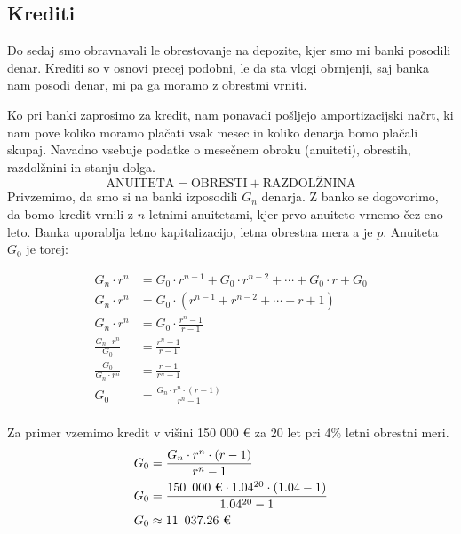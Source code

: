 \documentclass[12pt]{article}
\begin{document}
    \subsection{Krediti}
    Do sedaj smo obravnavali le obrestovanje na depozite, kjer smo mi banki posodili denar.
    Krediti so v osnovi precej podobni, le da sta vlogi obrnjenji, saj banka nam posodi
    denar, mi pa ga moramo z obrestmi vrniti.

    Ko pri banki zaprosimo za kredit, nam ponavadi pošljejo amportizacijski načrt, ki nam
    pove koliko moramo plačati vsak mesec in koliko denarja bomo plačali skupaj. Navadno
    vsebuje podatke o mesečnem obroku (anuiteti), obrestih, razdolžnini in 
    stanju dolga. 
    $$\text{ANUITETA} = \text{OBRESTI} + \text{RAZDOLŽNINA}$$
    Privzemimo, da smo si na banki izposodili $G_n$ denarja. Z banko se dogovorimo, da bomo
    kredit vrnili z $n$ letnimi anuitetami, kjer prvo anuiteto vrnemo čez eno leto. Banka
    uporablja letno kapitalizacijo, letna obrestna mera a je $p$. Anuiteta $G_0$ je torej:
    
    \begin{equation}
        \begin{split}
            G_n \cdot r^n & = G_0 \cdot r^{n - 1} + G_0 \cdot r^{n - 2} + \cdots + G_0 \cdot r + G_0 \\
            G_n \cdot r^n & = G_0 \cdot (r^{n - 1} + r^{n - 2} + \cdots + r + 1) \\
            G_n \cdot r^n & = G_0 \cdot \frac{r^n - 1}{r - 1} \\
            \frac{G_n \cdot r^n}{G_0} & = \frac{r^n - 1}{r - 1} \\
            \frac{G_0}{G_n \cdot r^n} & = \frac{r - 1}{r^n - 1} \\
            G_0 & = \frac{G_n \cdot r^n \cdot (r - 1)}{r^n - 1} \\
        \end{split}
    \end{equation}

    Za primer vzemimo kredit v višini 150 000 € za 20 let pri 4\% letni obrestni meri. 
    \begin{equation}
        \begin{split}
            G_0 & = \frac{G_n \cdot r^n \cdot (r - 1)}{r^n - 1} \\
            G_0 & = \frac{150 \enskip 000 \text{ €} \cdot 1.04^{20} \cdot (1.04 - 1)}{1.04^{20} - 1} \\
            G_0 & \approx 11 \enskip 037.26 \text{ €}
        \end{split}
    \end{equation}
\end{document}
